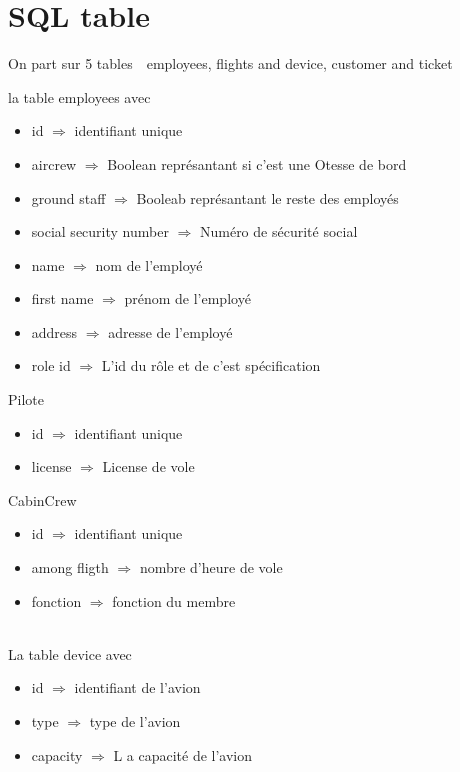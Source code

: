 \section{SQL table}
On part sur 5 tables 
   \,\, employees, flights and device, customer and ticket

la table employees avec 

    \begin{itemize}
        \centering
        \item id $\Rightarrow$ identifiant unique 
        \item aircrew $\Rightarrow$ Boolean représantant si c'est une Otesse de bord
        \item ground staff $\Rightarrow$ Booleab représantant le reste des employés
        \item social security number $\Rightarrow$ Numéro de sécurité social
        \item name $\Rightarrow$ nom de l'employé 
        \item first name $\Rightarrow$ prénom de l'employé
        \item address $\Rightarrow$ adresse de l'employé
        \item role id $\Rightarrow$ L'id du rôle et de c'est spécification
    \end{itemize}

Pilote 
    \begin{itemize}
        \centering
        \item id $\Rightarrow$ identifiant unique 
        \item license $\Rightarrow$ License de vole 
    \end{itemize}

CabinCrew 
    \begin{itemize}
        \centering
        \item id $\Rightarrow$ identifiant unique
        \item among fligth $\Rightarrow$ nombre d'heure de vole
        \item fonction $\Rightarrow$ fonction du membre
    \end{itemize}
        
\.\\
La table device avec         
    \begin{itemize}
        \centering
        \item id $\Rightarrow$ identifiant de l'avion
        \item type $\Rightarrow$ type de l'avion
        \item capacity $\Rightarrow$ L a capacité de l'avion                
    \end{itemize}

